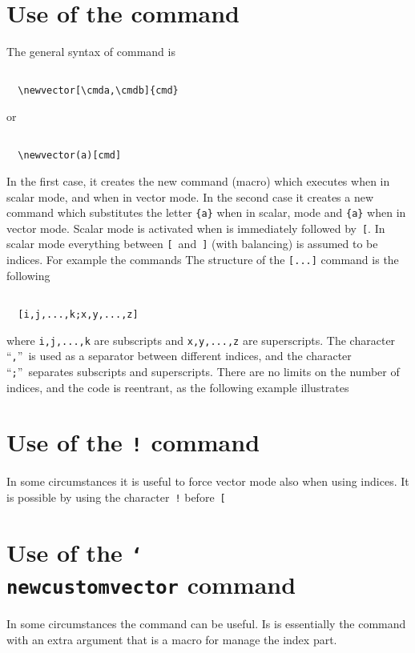 \documentclass[a4paper]{article}
\begin{document}
\section{Use of the  command}
The general syntax of  command is
\begin{verbatim}

  \newvector[\cmda,\cmdb]{cmd}

\end{verbatim}
or 
\begin{verbatim}

  \newvector(a)[cmd]

\end{verbatim}
In the first case, it creates the new command (macro) 
which executes  when in scalar mode, and 
when in vector mode.  In the second case it creates a new command
 which substitutes the letter \verb'{a}'
when in scalar, mode and \verb'{a}' when in vector
mode.  Scalar mode is activated when  is immediately
followed by~\verb|[|.  In scalar mode everything between
\verb|[|~and~\verb|]| (with balancing) is assumed to be indices.  For
example the commands
%
%
The structure of the \verb|[...]| command is the following
\begin{verbatim}

  [i,j,...,k;x,y,...,z]

\end{verbatim}
where \verb'i,j,...,k' are subscripts and \verb'x,y,...,z' are
superscripts.  The character ``\verb|,|''~is used as a separator
between different indices, and the character ``\verb|;|''~separates
subscripts and superscripts.  There are no limits on the number of
indices, and the code is reentrant, as the following example
illustrates
%
%

\section{Use of the \texttt{!} command}
In some circumstances it is useful to force vector mode also when
using indices.  It is possible by using the character~\verb'!' 
before~\verb'['
%
%

\section{Use of the \texttt{\char`\\newcustomvector} command}
In some circumstances the command  can be
useful.  Is is essentially the  command with an
extra argument that is a macro for manage the index part.
%
%
\end{document}
